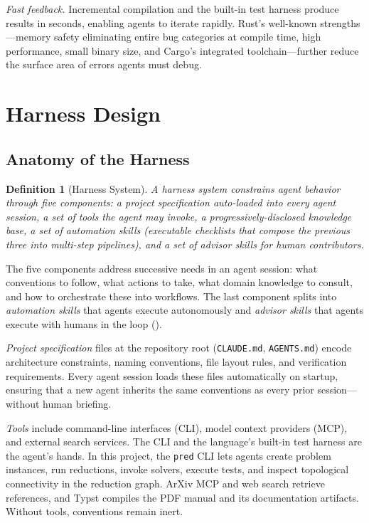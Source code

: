\documentclass[conference]{IEEEtran}
\newtheorem{definition}{Definition}
\begin{document}
\emph{Fast feedback.}
Incremental compilation and the built-in test harness produce results in seconds, enabling agents to iterate rapidly.
Rust's well-known strengths---memory safety eliminating entire bug categories at compile time, high performance, small binary size, and Cargo's integrated toolchain---further reduce the surface area of errors agents must debug.

\section{Harness Design}\label{sec:method}

\subsection{Anatomy of the Harness}\label{sec:skills}

\begin{definition}[Harness System]
A \emph{harness system} constrains agent behavior through five components: a project specification auto-loaded into every agent session, a set of tools the agent may invoke, a progressively-disclosed knowledge base, a set of automation skills (executable checklists that compose the previous three into multi-step pipelines), and a set of advisor skills for human contributors.
\end{definition}

The five components address successive needs in an agent session: what conventions to follow, what actions to take, what domain knowledge to consult, and how to orchestrate these into workflows.
The last component splits into \emph{automation skills} that agents execute autonomously and \emph{advisor skills} that agents execute with humans in the loop ().

\emph{Project specification} files at the repository root (\texttt{CLAUDE.md}, \texttt{AGENTS.md}) encode architecture constraints, naming conventions, file layout rules, and verification requirements.
Every agent session loads these files automatically on startup, ensuring that a new agent inherits the same conventions as every prior session---without human briefing.

\emph{Tools} include command-line interfaces (CLI), model context providers (MCP), and external search services.
The CLI and the language's built-in test harness are the agent's hands.
In this project, the \texttt{pred} CLI lets agents create problem instances, run reductions, invoke solvers, execute tests, and inspect topological connectivity in the reduction graph.
ArXiv MCP and web search retrieve references, and Typst compiles the PDF manual and its documentation artifacts.
Without tools, conventions remain inert.
\end{document}
